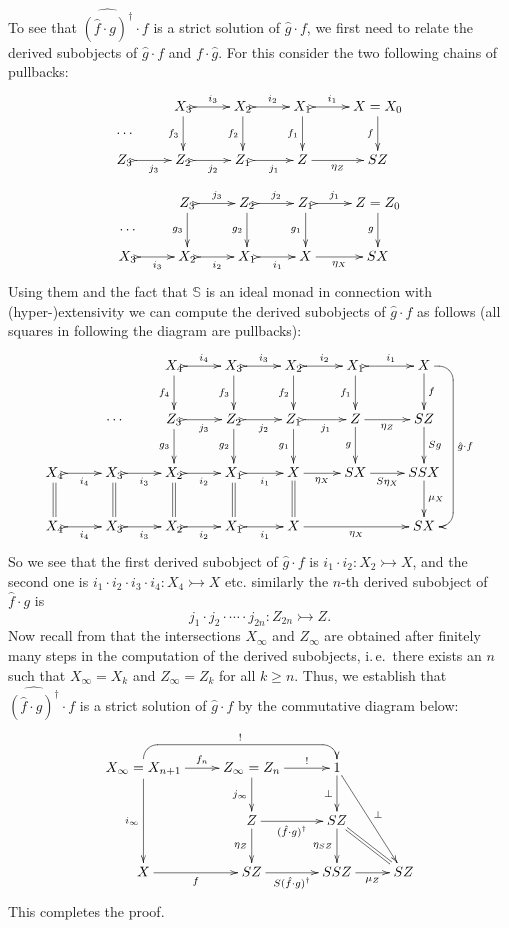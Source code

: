 \documentclass{LMCS}
\theoremstyle{plain}
\theoremstyle{definition}
\numberwithin{equation}{section}
\begin{document}
\begin{exa}
\begin{enumerate}[label=\({\alph*}]
To see that $\widehat{(\hat f\cdot g)^\dag}\cdot f$ is a strict solution of $\hat g\cdot f$, we first need to relate the derived subobjects of $\hat g\cdot f$ and $f\cdot \hat g$. For this consider the two following chains of pullbacks:
\[\xymatrix{
\ar@{}[d]|{\objectstyle\cdots}&X_3\ar@{>->}[r]^-{i_3}\ar[d]_-{f_3}&X_2\ar@{>->}[r]^-{i_2}\ar[d]_-{f_2}&X_1\ar@{>->}[r]^-{i_1}\ar[d]_-{f_1}&X=X_0\ar[d]_-{f}\\
Z_3\ar@{>->}[r]_-{j_3}&Z_2\ar@{>->}[r]_-{j_2}&Z_1\ar@{>->}[r]_-{j_1}&Z\ar[r]_-{\eta_Z}&SZ
}
\]
\[
\xymatrix{
\ar@{}[d]|{\objectstyle\cdots}&Z_3\ar@{>->}[r]^-{j_3}\ar[d]_-{g_3}&Z_2\ar@{>->}[r]^-{j_2}\ar[d]_-{g_2}&Z_1\ar@{>->}[r]^-{j_1}\ar[d]_-{g_1}&Z=Z_0\ar[d]_-{g}\\
X_3\ar@{>->}[r]_-{i_3}&X_2\ar@{>->}[r]_-{i_2}&X_1\ar@{>->}[r]_-{i_1}&X\ar[r]_-{\eta_X}&SX
}
\]
Using them and the fact that $\mathbb{S}$ is an ideal monad in
connection with (hyper-)extensivity we can compute the derived
subobjects of $\hat g\cdot f$ as follows (all squares in following the diagram are pullbacks):
\[
\xymatrix{
&&X_4\ar[d]_-{f_4}\ar@{>->}[r]^-{i_4}&X_3\ar@{>->}[r]^-{i_3}\ar[d]_-{f_3}&X_2\ar@{>->}[r]^-{i_2}\ar[d]_-{f_2}&
X_1\ar@{>->}[r]^-{i_1}\ar[d]_-{f_1}&X\ar[d]^-f\\
&\cdots&Z_3\ar@{>->}[r]_-{j_3}\ar[d]_-{g_3}&Z_2\ar@{>->}[r]_-{j_2}\ar[d]_-{g_2}&Z_1\ar@{>->}[r]_-{j_1}\ar[d]_-{g_1}&Z\ar[d]_-{g}
\ar[r]_-{\eta_Z}&SZ\ar[d]^-{Sg}\\
X_4\ar@{>->}[r]_-{i_4}\ar@{=}[d]&X_3\ar@{=}[d]\ar@{>->}[r]_-{i_3}&X_2\ar@{=}[d]\ar@{>->}[r]_-{i_2}&X_1\ar@{=}[d]\ar@{>->}[r]_-{i_1}&X\ar@{=}[d]
\ar[r]_-{\eta_X}&SX\ar[r]_-{S\eta_X}&SSX\ar[d]^-{\mu_X}
\\
X_4\ar@{>->}[r]_-{i_4}&X_3\ar@{>->}[r]_-{i_3}&X_2\ar@{>->}[r]_-{i_2}&X_1\ar@{>->}[r]_-{i_1}&X\ar[rr]_-{\eta_X}&&SX\ar@{<-}`r[u]`[uuu]_-{\hat g\cdot f}[uuu]
}
\]
So we see that the first derived subobject of $\hat g\cdot f$ is
$i_1\cdot i_2:X_2\rightarrowtail X$, and the second one is $i_1\cdot
i_2\cdot i_3\cdot i_4:X_4\rightarrowtail X$ etc. similarly the $n$-th
derived subobject of $\hat f\cdot g$ is  
$$j_1\cdot j_2\cdot \cdots\cdot j_{2n}:Z_{2n}\rightarrowtail Z.$$
Now recall from \cite[Lemma~6.4]{abmv_how} that the intersections $X_\infty$ and
$Z_\infty$ are obtained after finitely many steps in the computation
of the derived subobjects, i.\,e.\ there exists an $n$ such that
$X_\infty=X_k$ and $Z_\infty =Z_k$ for all $k\geq n$. Thus, we
establish that $\widehat{(\hat f\cdot g)^\dag}\cdot f$ is a strict solution of $\hat g\cdot f$ by the commutative diagram below:
$$\xymatrix{
X_\infty=X_{n+1}\ar[r]^-{f_n}\ar[dd]_-{i_\infty}&Z_\infty=Z_{n}\ar[r]^-{!}\ar[d]_-{j_\infty}&1\ar[d]_-\bot\ar[rdd]^-\bot
\ar@{<-}`u[l]`[ll]_-{!}[ll]
\\
&Z\ar[r]_-{(\hat f \cdot g)^\dag}\ar[d]_-{\eta_Z}&SZ\ar[d]_-{\eta_{SZ}}\ar@{=}[rd]\\
X\ar[r]_-f&SZ\ar[r]_-{S(\hat f \cdot g)^\dag}&SSZ\ar[r]_-{\mu_Z}&SZ
}$$
This completes the proof.
\end{enumerate}
\end{exa}
\end{document}
